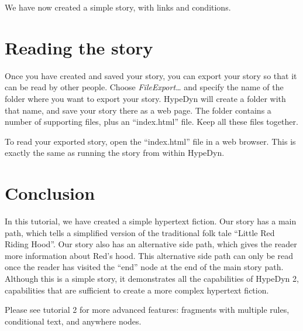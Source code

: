\documentclass{article}
\begin{document}
We have now created a simple story, with links and conditions.

\section{Reading the story}

Once you have created and saved your story, you can export your story so that it can be read by other people. Choose \textit{File\textrightarrow Export\ldots} and specify the name of the folder where you want to export your story. HypeDyn will create a folder with that name, and save your story there as a web page. The folder contains a number of supporting files, plus an ``index.html'' file. Keep all these files together.

To read your exported story, open the ``index.html'' file in a web browser. This is exactly the same as running the story from within HypeDyn.

\section{Conclusion}

In this tutorial, we have created a simple hypertext fiction. Our story has a main path, which tells a simplified version of the traditional folk tale ``Little Red Riding Hood''. Our story also has an alternative side path, which gives the reader more information about Red's hood. This alternative side path can only be read once the reader has visited the ``end'' node at the end of the main story path. Although this is a simple story, it demonstrates all the capabilities of HypeDyn 2, capabilities that are sufficient to create a more complex hypertext fiction.

Please see tutorial 2 for more advanced features: fragments with multiple rules, conditional text, and anywhere nodes.
\end{document}
